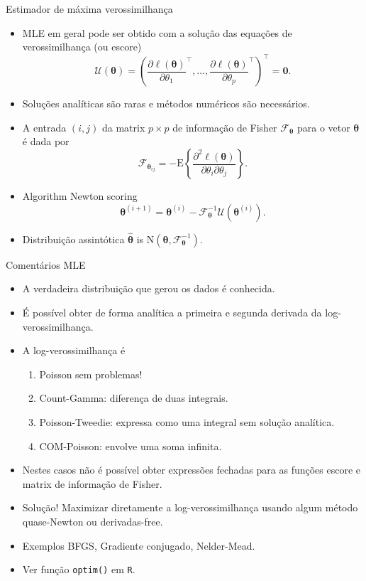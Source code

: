 \documentclass[10pt, aspectratio=169]{beamer}\usepackage[]{graphicx}\usepackage[]{color}
\begin{document}
\begin{frame}{Estimador de máxima verossimilhança}
\begin{itemize}
  \item MLE em geral pode ser obtido com a solução das equações de verossimilhança (ou escore)
  $$\mathcal{U}(\boldsymbol{\theta}) = \left ( \frac{\partial \ell(\boldsymbol{\theta})}{\partial \theta_1}^\top, \ldots, \frac{\partial \ell(\boldsymbol{\theta})}{\partial \theta_p}^\top \right )^\top = \boldsymbol{0}.$$
  \item Soluções analíticas são raras e métodos numéricos são necessários.
  \item A entrada $(i,j)$ da matrix $p \times p$ de informação de Fisher 
  $\mathcal{F}_{\boldsymbol{\theta}}$ para o vetor $\boldsymbol{\theta}$ é dada por
$$
\mathcal{F}_{\boldsymbol{\theta}_{ij}} =-\mathrm{E} \left \{ \frac{\partial^2 \ell(\boldsymbol{\theta})}{\partial\theta_i\partial\theta_j} \right \}.
$$
  \item Algorithm Newton scoring
$$  
\boldsymbol{\theta}^{(i+1)} = \boldsymbol{\theta}^{(i)} - \mathcal{F}_{\boldsymbol{\theta}}^{-1} \mathcal{U}(\boldsymbol{\theta}^{(i)}).
$$
  \item Distribuição assintótica $\boldsymbol{\hat{\theta}}$ is $\mathrm{N}(\boldsymbol{\theta}, \mathcal{F}_{\boldsymbol{\theta}}^{-1})$.
\end{itemize}
\end{frame}

\begin{frame}{Comentários MLE}
\begin{itemize}
  \item A verdadeira distribuição que gerou os dados é conhecida.
  \item É possível obter de forma analítica a primeira e segunda derivada
  da log-verossimilhança.
  \item A log-verossimilhança é
  \begin{enumerate}
    \item Poisson sem problemas!
    \item Count-Gamma: diferença de duas integrais.
    \item Poisson-Tweedie: expressa como uma integral sem solução analítica.
    \item COM-Poisson: envolve uma soma infinita.
  \end{enumerate}
  \item Nestes casos não é possível obter expressões fechadas para as
  funções escore e matrix de informação de Fisher.
  \item Solução! Maximizar diretamente a log-verossimilhança usando
  algum método quase-Newton ou derivadas-free. 
  \item Exemplos BFGS, Gradiente conjugado, Nelder-Mead.
  \item Ver função \texttt{optim()} em \texttt{R}.
  
\end{itemize}
\end{frame}
\end{document}
